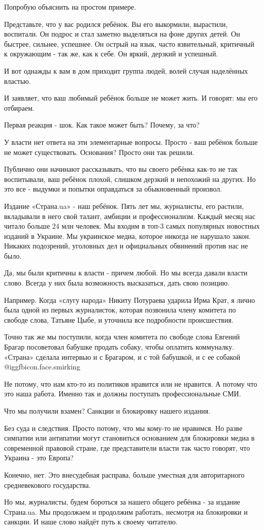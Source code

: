 Попробую объяснить на простом примере. 

Представьте, что у вас родился ребёнок. Вы его выкормили, вырастили, воспитали.
Он подрос и стал заметно выделяться на фоне других детей. Он быстрее, сильнее,
успешнее. Он острый на язык, часто язвительный, критичный к окружающим - так
же, как к себе. Он яркий, дерзкий и успешный. 

И вот однажды к вам в дом приходит группа людей, волей случая наделённых
властью. 

И заявляет, что ваш любимый ребёнок больше не может жить. И говорят: мы его
отбираем. 

Первая реакция - шок. Как такое может быть? Почему, за что? 

У власти нет ответа на эти элементарные вопросы. Просто - ваш ребёнок больше не
может существовать. Основания? Просто они так решили. 

Публично они начинают рассказывать, что вы своего ребёнка как-то не так
воспитывали, ваш ребёнок плохой, слишком дерзкий и непохожий на других. Но это
все - выдумки и попытки оправдаться за обыкновенный произвол. 

Издание «Страна.ua» - наш ребёнок. Пять лет мы, журналисты, его растили,
вкладывали в него свой талант, амбиции и профессионализм. Каждый месяц нас
читало больше 24 млн человек. Мы входим в топ-3 самых популярных новостных
изданий в Украине. Мы украинское медиа, которое никогда не нарушало закон.
Никаких подозрений, уголовных дел и официальных обвинений против нас не было. 

Да, мы были критичны к власти - причем любой. Но мы всегда давали власти слово.
Всегда у них была возможность высказаться, дать свою позицию. 

Например. Когда «слугу народа» Никиту Потураева ударила Ирма Крат, я лично была
одной из первых журналисток, которая позвонила члену комитета по свободе слова,
Татьяне Цыбе, и уточнила все подробности происшествия.

Точно так же мы поступили, когда член комитета по свободе слова Евгений Брагар
посоветовал бабушке продать собаку, чтобы оплатить коммуналку. «Страна» сделала
интервью и с Брагаром, и с той бабушкой, и с ее собакой  @igg{fbicon.face.smirking}  

Не потому, что нам кто-то из политиков нравится или не нравится. А потому что
это наша работа. Именно так и должны поступать профессиональные СМИ. 

Что мы получили взамен? Санкции и блокировку нашего издания. 

Без суда и следствия. Просто потому, что мы кому-то не нравимся. Но разве
симпатии или антипатии могут становиться основанием для блокировки медиа в
современной правовой стране, где представители власти так часто  говорят, что
Украина - это Европа? 

Конечно, нет. Это внесудебная расправа, больше уместная для авторитарного
средневекового государства.

Но мы, журналисты, будем бороться за нашего общего ребёнка - за издание
Страна.ua. Мы продолжаем и продолжим работать, несмотря на блокировки и
санкции. И наше слово найдёт путь к своему читателю.
